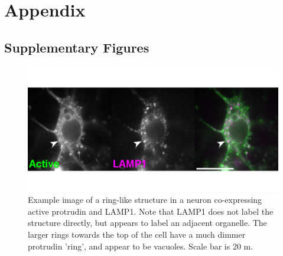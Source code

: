 \documentclass[
  12pt,
  a4paper,
]{book}
\begin{document}
\chapter*{Appendix}\label{APPENDIX}

\setcounter{chapter}{5}
\setcounter{section}{0}
\setcounter{figure}{0}

\section{Supplementary Figures}\label{SUPPLEMENT}

\begin{figure}
\includegraphics{./figures/full/suppl-ring-1} \caption[Supplementary figure; Example image of a ring-like structure in a neuron]{Example image of a ring-like structure in a neuron co-expressing active protrudin and LAMP1.  Note that LAMP1 does not label the structure directly, but appears to label an adjacent organelle.  The larger rings towards the top of the cell have a much dimmer protrudin 'ring', and appear to be vacuoles.  Scale bar is 20 \textmu{}m.}\label{fig:suppl-ring}
\end{figure}
\end{document}
